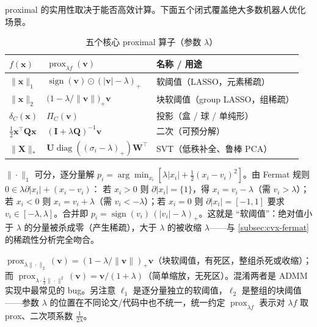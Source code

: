 proximal 的实用性取决于能否高效计算。下面五个闭式覆盖绝大多数机器人优化场景。

\begin{table}[H]\centering\small
\caption{五个核心 proximal 算子（参数 $\lambda$）}
\label{tab:prox-closed}
\begin{tabular}{lll}
\toprule
$f(\mathbf x)$ & $\operatorname{prox}_{\lambda f}(\mathbf v)$ & 名称 / 用途 \\
\midrule
$\|\mathbf x\|_1$ & $\operatorname{sign}(\mathbf v)\odot(|\mathbf v|-\lambda)_+$ & 软阈值（LASSO，元素稀疏） \\
$\|\mathbf x\|_2$ & $\big(1-\lambda/\|\mathbf v\|\big)_+\mathbf v$ & 块软阈值（group LASSO，组稀疏） \\
$\delta_C(\mathbf x)$ & $\Pi_C(\mathbf v)$ & 投影（盒 / 球 / 单纯形） \\
$\tfrac12\mathbf x^\top\mathbf Q\mathbf x$ & $(\mathbf I+\lambda\mathbf Q)^{-1}\mathbf v$ & 二次（可预分解） \\
$\|\mathbf X\|_\ast$ & $\mathbf U\operatorname{diag}((\sigma_i-\lambda)_+)\mathbf W^\top$ & SVT（低秩补全、鲁棒 PCA） \\
\bottomrule
\end{tabular}
\end{table}

\begin{derivation}
$\|\cdot\|_1$ 可分，逐分量解 $p_i=\arg\min_{x_i}[\lambda|x_i|+\tfrac12(x_i-v_i)^2]$。由 Fermat 规则 $0\in\lambda\partial|x_i|+(x_i-v_i)$：
若 $x_i>0$ 则 $\partial|x_i|=\{1\}$，得 $x_i=v_i-\lambda$（需 $v_i>\lambda$）；若 $x_i<0$ 则 $x_i=v_i+\lambda$（需 $v_i<-\lambda$）；若 $x_i=0$ 则 $\partial|x_i|=[-1,1]$ 要求 $v_i\in[-\lambda,\lambda]$。合并即 $p_i=\operatorname{sign}(v_i)\,(|v_i|-\lambda)_+$。这就是 “软阈值”：绝对值小于 $\lambda$ 的分量被杀成零（产生稀疏），大于 $\lambda$ 的被收缩 $\lambda$——与 \cref{subsec:cvx-fermat} 的稀疏性分析完全吻合。
\end{derivation}

\begin{pitfall}
$\operatorname{prox}_{\lambda\|\cdot\|_2}(\mathbf v)=(1-\lambda/\|\mathbf v\|)_+\mathbf v$（块软阈值，有死区，整组杀死或收缩）；而 $\operatorname{prox}_{\lambda\cdot\frac12\|\cdot\|^2}(\mathbf v)=\mathbf v/(1+\lambda)$（简单缩放，无死区）。混淆两者是 ADMM 实现中最常见的 bug。另注意 $\ell_1$ 是逐分量独立的软阈值，$\ell_2$ 是整组的块阈值——参数 $\lambda$ 的位置在不同论文/代码中也不统一，统一约定 $\operatorname{prox}_{\lambda f}$ 表示对 $\lambda f$ 取 prox、二次项系数 $\tfrac1{2\lambda}$。
\end{pitfall}

